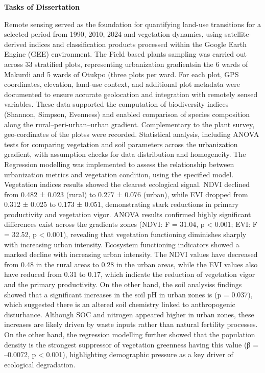 {}\textbf{Tasks of Dissertation}

Remote sensing served as the foundation for quantifying land-use transitions for a selected period from 1990, 2010, 2024 and vegetation dynamics, using satellite-derived indices and classification products processed within the Google Earth Engine (GEE) environment. The Field based plants sampling was carried out across 33 stratified plots, representing urbanization gradientsin the 6 wards of Makurdi and 5 wards of Otukpo (three plots per ward. For each plot, GPS coordinates, elevation, land-use context, and additional plot metadata were documented to ensure accurate geolocation and integration with remotely sensed variables. These data supported the computation of biodiversity indices (Shannon, Simpson, Evenness) and enabled comparison of species composition along the rural--peri-urban--urban gradient. Complementary to the plant survey, geo-cordinates of the plotss were recorded.
Statistical analysis, including ANOVA tests for comparing vegetation and soil parameters across the urbanization gradient, with assumption checks for data distribution and homogeneity. The Regression modelling was implemented to assess the relationship between urbanization metrics and vegetation condition, using the specified model. Vegetation indices results showed the clearest ecological signal. NDVI declined from 0.482 ± 0.023 (rural) to 0.277 ± 0.076 (urban), while EVI dropped from 0.312 ± 0.025 to 0.173 ± 0.051, demonstrating stark reductions in primary productivity and vegetation vigor. ANOVA results confirmed highly significant differences exist across the gradients zones (NDVI: F = 31.04, p \textless{} 0.001; EVI: F = 32.52, p \textless{} 0.001), revealing that vegetation functioning diminishes sharply with increasing urban intensity. Ecosystem functioning indicators showed a marked decline with increasing urban intensity. The NDVI values have decreased from 0.48 in the rural areas to 0.28 in the urban areas, while the EVI values also have reduced from 0.31 to 0.17, which indicate the reduction of vegetation vigor and the primary productivity. On the other hand, the soil analysis\textquotesingle s findings showed that a significant increases in the soil pH in urban zones is (p = 0.037), which suggested there is an altered soil chemistry linked to anthropogenic disturbance. Although SOC and nitrogen appeared higher in urban zones, these increases are likely driven by waste inputs rather than natural fertility processes. On the other hand, the regression modelling further showed that the population density is the strongest suppressor of vegetation greenness having this value (β = --0.0072, p \textless{} 0.001), highlighting demographic pressure as a key driver of ecological degradation.
